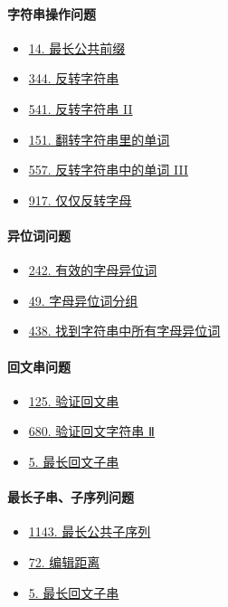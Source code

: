 \paragraph{字符串操作问题}

\begin{itemize}
  \item \hyperref[leetcode:14]{14. 最长公共前缀}
  \item \hyperref[leetcode:344]{344. 反转字符串}
  \item \hyperref[leetcode:541]{541. 反转字符串 II}
  \item \hyperref[leetcode:151]{151. 翻转字符串里的单词}
  \item \hyperref[leetcode:557]{557. 反转字符串中的单词 III}
  \item \hyperref[leetcode:917]{917. 仅仅反转字母}
\end{itemize}

\paragraph{异位词问题}

\begin{itemize}
  \item \hyperref[leetcode:242]{242. 有效的字母异位词}
  \item \hyperref[leetcode:49]{49. 字母异位词分组}
  \item \hyperref[leetcode:438]{438. 找到字符串中所有字母异位词}
\end{itemize}

\paragraph{回文串问题}

\begin{itemize}
  \item \hyperref[leetcode:125]{125. 验证回文串}
  \item \hyperref[leetcode:680]{680. 验证回文字符串 Ⅱ}
  \item \hyperref[leetcode:5]{5. 最长回文子串}
\end{itemize}

\paragraph{最长子串、子序列问题}

\begin{itemize}
  \item \hyperref[leetcode:1143]{1143. 最长公共子序列}
  \item \hyperref[leetcode:72]{72. 编辑距离}
  \item \hyperref[leetcode:5]{5. 最长回文子串}
\end{itemize}

